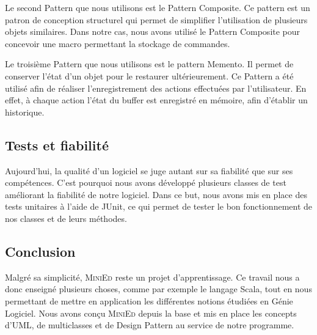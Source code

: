 \documentclass[a4paper]{article}
\begin{document}
		\vspace{0.5cm}

		Le second Pattern que nous utilisons est le Pattern Composite. Ce pattern est un patron de conception structurel qui permet de simplifier l'utilisation de plusieurs objets similaires. Dans notre cas, nous avons utilisé le Pattern Composite pour concevoir une macro permettant la stockage de commandes.

		\vspace{0.5cm}

		Le troisième Pattern que nous utilisons est le pattern Memento. Il permet de conserver l’état d’un objet pour le restaurer ultérieurement. Ce Pattern a été utilisé afin de réaliser l’enregistrement des actions effectuées par l’utilisateur. En effet, à chaque action l’état du buffer est enregistré en mémoire, afin d'établir un historique.

		\vspace{0.5cm}

		\subsection{Tests et fiabilité}

		\vspace{0.5cm}

		Aujourd’hui, la qualité d’un logiciel se juge autant sur sa fiabilité que sur ses compétences. C’est pourquoi nous avons développé plusieurs classes de test améliorant la fiabilité de notre logiciel. Dans ce but, nous avons mis en place des tests unitaires à l’aide de JUnit, ce qui permet de tester le bon fonctionnement de nos classes et de leurs méthodes.

		\vspace{0.5cm}



	\begin{center}
		\section{Conclusion}
	\end{center}

	\vspace{0.5cm}

	Malgré sa simplicité, \textsc{MiniEd} reste un projet d'apprentissage. Ce travail nous a donc enseigné plusieurs choses, comme par exemple le langage Scala, tout en nous permettant de mettre en application les différentes notions étudiées en Génie Logiciel. Nous avons conçu \textsc{MiniEd} depuis la base et mis en place les concepts d'UML, de multiclasses et de Design Pattern au service de notre programme.
\end{document}
